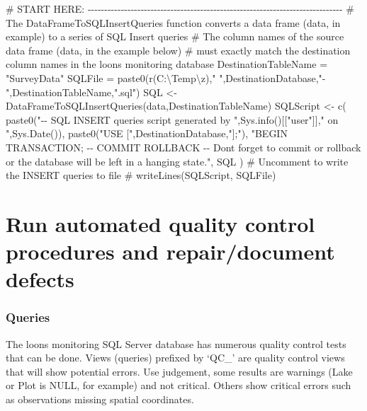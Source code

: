 \documentclass[
  letterpaper,
  DIV=11,
  numbers=noendperiod]{scrreprt}
\newenvironment{Shaded}{\begin{snugshade}}{\end{snugshade}}
\newcommand{\CommentTok}[1]{\textcolor[rgb]{0.37,0.37,0.37}{#1}}
\newcommand{\FunctionTok}[1]{\textcolor[rgb]{0.28,0.35,0.67}{#1}}
\newcommand{\NormalTok}[1]{\textcolor[rgb]{0.00,0.23,0.31}{#1}}
\newcommand{\OtherTok}[1]{\textcolor[rgb]{0.00,0.23,0.31}{#1}}
\newcommand{\StringTok}[1]{\textcolor[rgb]{0.13,0.47,0.30}{#1}}
\begin{document}
\begin{Shaded}
\begin{Highlighting}[]
\CommentTok{\# START HERE: {-}{-}{-}{-}{-}{-}{-}{-}{-}{-}{-}{-}{-}{-}{-}{-}{-}{-}{-}{-}{-}{-}{-}{-}{-}{-}{-}{-}{-}{-}{-}{-}{-}{-}{-}{-}{-}{-}{-}{-}{-}{-}{-}{-}{-}{-}{-}{-}{-}{-}{-}{-}{-}{-}{-}{-}{-}{-}{-}{-}{-}{-}{-}{-}{-}{-}{-}{-}{-}{-}{-}{-}{-}{-}{-}{-}{-}}
\CommentTok{\# The DataFrameToSQLInsertQueries function converts a data frame (data, in example) to a series of SQL Insert queries}
\CommentTok{\# The column names of the source data frame (data, in the example below)}
\CommentTok{\# must exactly match the destination column names in the loons monitoring database}
\NormalTok{DestinationTableName }\OtherTok{=} \StringTok{"SurveyData"}
\NormalTok{SQLFile }\OtherTok{=} \FunctionTok{paste0}\NormalTok{(r}\StringTok{\textquotesingle{}(C:\textbackslash{}Temp\textbackslash{}z)\textquotesingle{}}\NormalTok{,}\StringTok{" "}\NormalTok{,DestinationDatabase,}\StringTok{"{-}"}\NormalTok{,DestinationTableName,}\StringTok{".sql"}\NormalTok{)}
\NormalTok{SQL }\OtherTok{\textless{}{-}} \FunctionTok{DataFrameToSQLInsertQueries}\NormalTok{(data,DestinationTableName)}
\NormalTok{SQLScript }\OtherTok{\textless{}{-}} \FunctionTok{c}\NormalTok{(}
  \FunctionTok{paste0}\NormalTok{(}\StringTok{"{-}{-} SQL INSERT queries script generated by "}\NormalTok{,}\FunctionTok{Sys.info}\NormalTok{()[[}\StringTok{"user"}\NormalTok{]],}\StringTok{" on "}\NormalTok{,}\FunctionTok{Sys.Date}\NormalTok{()),}
  \FunctionTok{paste0}\NormalTok{(}\StringTok{"USE ["}\NormalTok{,DestinationDatabase,}\StringTok{"];"}\NormalTok{),}
  \StringTok{"BEGIN TRANSACTION; {-}{-} COMMIT ROLLBACK {-}{-} Don\textquotesingle{}t forget to commit or rollback or the database will be left in a hanging state."}\NormalTok{,}
\NormalTok{  SQL}
\NormalTok{)}
\CommentTok{\# Uncomment to write the INSERT queries to file}
\CommentTok{\# writeLines(SQLScript, SQLFile)}
\end{Highlighting}
\end{Shaded}

\section{Run automated quality control procedures and repair/document
defects}\label{run-automated-quality-control-procedures-and-repairdocument-defects}

\subsubsection{Queries}\label{queries}

The loons monitoring SQL Server database has numerous quality control
tests that can be done. Views (queries) prefixed by `QC\_' are quality
control views that will show potential errors. Use judgement, some
results are warnings (Lake or Plot is NULL, for example) and not
critical. Others show critical errors such as observations missing
spatial coordinates.
\end{document}
